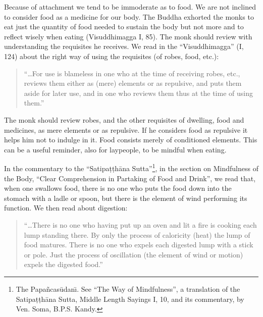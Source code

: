 \documentclass{book}
\begin{document}
Because of attachment we tend to be immoderate as to food. We are not
inclined to consider food as a medicine for our body. The Buddha
exhorted the monks to eat just the quantity of food needed to sustain
the body but not more and to reflect wisely when eating (Visuddhimagga
I, 85). The monk should review with understanding the requisites he
receives. We read in the ``Visuddhimagga'' (I, 124) about the right way
of using the requisites (of robes, food, etc.):




\begin{quote}\begin{flushleft}
``\ldots For use is blameless in one who at the time of receiving robes,
etc., reviews them either as (mere) elements or as repulsive, and puts
them aside for later use, and in one who reviews them thus at the time
of using them.'' 
\end{flushleft}\end{quote}




The monk should review robes, and the other requisites of dwell\-ing, food
and medicines, as mere elements or as repulsive. If he considers food
as repulsive it helps him not to indulge in it. Food consists merely of
conditioned elements. This can be a useful reminder, also for
laypeople, to be mindful when eating.

In the commentary to the ``Satipa\d t\d th{\=a}na Sutta''\footnote{The
Papa\~ncas\=udan\=\i. See ``The Way of Mindfulness'', a translation of
the Satipa\d t\d th{\=a}na Sutta, Middle Length Sayings I, 10, and
its commentary, by Ven. Soma, B.P.S. Kandy. }, in the section on
Mindfulness of the Body, ``Clear Comprehension in Partaking of Food and
Drink'', we read that, when one swallows food, there is no one who puts
the food down into the stomach with a ladle or spoon, but there is the
element of wind performing its function. We then read about digestion:




\begin{quote}\begin{flushleft}
``\dots There is no one who having put up an oven and lit a fire is
cooking each lump standing there. By only the process of caloricity
(heat) the lump of food matures. There is no one who expels each
digested lump with a stick or pole. Just the process of oscillation
(the element of wind or motion) expels the digested food.'' 

\end{flushleft}\end{quote}
\end{document}
